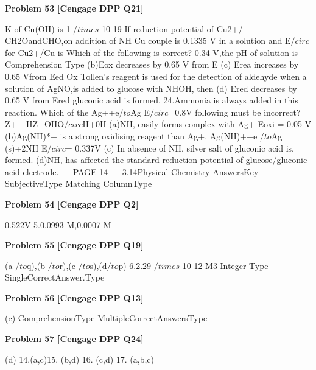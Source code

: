 \begin{problembox}
\textbf{Problem 53} \hfill \textbf{[Cengage DPP Q21]}
\label{q:ext-cng_dpp_all_questions-53}

K of Cu(OH) is 1 $/times$ 10-19 If reduction potential of Cu2+/
CH2OandCHO,on addition of NH
Cu couple is 0.1335 V in a solution and E$/circ$ for Cu2+/Cu is
Which of the following is correct?
0.34 V,the pH of solution is
Comprehension Type
(b)Eox decreases by 0.65 V from E
(c) Erea increases by 0.65 Vfrom Eed
Ox
Tollen's reagent is used for the detection of aldehyde when
a solution of AgNO,is added to glucose with NHOH, then
(d) Ered decreases by 0.65 V from Ered
gluconic acid is formed.
24.Ammonia is always added in this reaction. Which of the
Ag++e$/to$Ag
E$/circ$=0.8V
following must be incorrect?
Z+ +HZ+OHO$/circ$H+0H
(a)NH, easily forms complex with Ag+
Eoxi =-0.05 V
(b)Ag(NH)*+ is a strong oxidising reagent than Ag+.
Ag(NH)++e $/to$Ag (s)+2NH
E$/circ$= 0.337V
(c) In absence of NH, silver salt of gluconic acid is.
formed.
(d)NH, has affected the standard reduction potential of
glucose/gluconic acid electrode.
--- PAGE 14 ---
3.14Physical Chemistry
AnswersKey
SubjectiveType
Matching ColumnType
\end{problembox}

\begin{problembox}
\textbf{Problem 54} \hfill \textbf{[Cengage DPP Q2]}
\label{q:ext-cng_dpp_all_questions-54}

0.522V 5.0.0993 M,0.0007 M
\end{problembox}

\begin{problembox}
\textbf{Problem 55} \hfill \textbf{[Cengage DPP Q19]}
\label{q:ext-cng_dpp_all_questions-55}

(a $/to$q),(b $/to$r),(c $/to$s),(d$/to$p)
6.2.29 $/times$ 10-12 M3
Integer Type
SingleCorrectAnswer.Type
\end{problembox}

\begin{problembox}
\textbf{Problem 56} \hfill \textbf{[Cengage DPP Q13]}
\label{q:ext-cng_dpp_all_questions-56}

(c)
ComprehensionType
MultipleCorrectAnswersType
\end{problembox}

\begin{problembox}
\textbf{Problem 57} \hfill \textbf{[Cengage DPP Q24]}
\label{q:ext-cng_dpp_all_questions-57}

(d)
14.(a,c)15. (b,d) 16. (c,d) 17. (a,b,c)
\end{problembox}